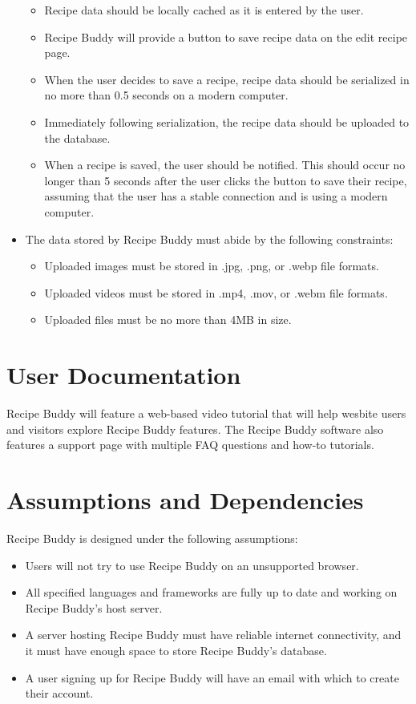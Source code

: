 \documentclass{scrreprt}
\begin{document}
\begin{itemize}
\begin{itemize}
        \item Recipe data should be locally cached as it is entered by the user.
        \item Recipe Buddy will provide a button to save recipe data on the edit recipe page.
        \item When the user decides to save a recipe, recipe data should be serialized in no more than 0.5 seconds on a modern computer.
        \item Immediately following serialization, the recipe data should be uploaded to the database.
        \item When a recipe is saved, the user should be notified. This should occur no longer than 5 seconds after the user clicks the button to save their recipe, assuming that the user has a stable connection and is using a modern computer.

    \end{itemize}

    \item The data stored by Recipe Buddy must abide by the following constraints:
    \begin{itemize}

        \item Uploaded images must be stored in .jpg, .png, or .webp file formats.
        \item Uploaded videos must be stored in .mp4, .mov, or .webm file formats.
        \item Uploaded files must be no more than 4MB in size.

    \end{itemize}

\end{itemize}

\section{User Documentation}
Recipe Buddy will feature a web-based video tutorial that will help wesbite users and visitors explore Recipe Buddy features. The Recipe Buddy software also features a support page with multiple FAQ questions and how-to tutorials.

\section{Assumptions and Dependencies}
Recipe Buddy is designed under the following assumptions:
\begin{itemize}
    \item Users will not try to use Recipe Buddy on an unsupported browser.
    \item All specified languages and frameworks are fully up to date and working on Recipe Buddy's host server.
    \item A server hosting Recipe Buddy must have reliable internet connectivity, and it must have enough space to store Recipe Buddy's database.
    \item A user signing up for Recipe Buddy will have an email with which to create their account.
\end{itemize}
\end{document}
